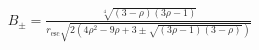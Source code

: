 \documentclass[preview]{standalone}
\begin{document}
\begin{align*}
B_\pm=\frac{\sqrt[4]{(3-\rho)(3\rho-1)}}{r_{\text{esc}}\sqrt{2\left(4\rho^2-9\rho+3\pm\sqrt{(3\rho-1)(3-\rho)}\right)}}
\end{align*}
\end{document}
